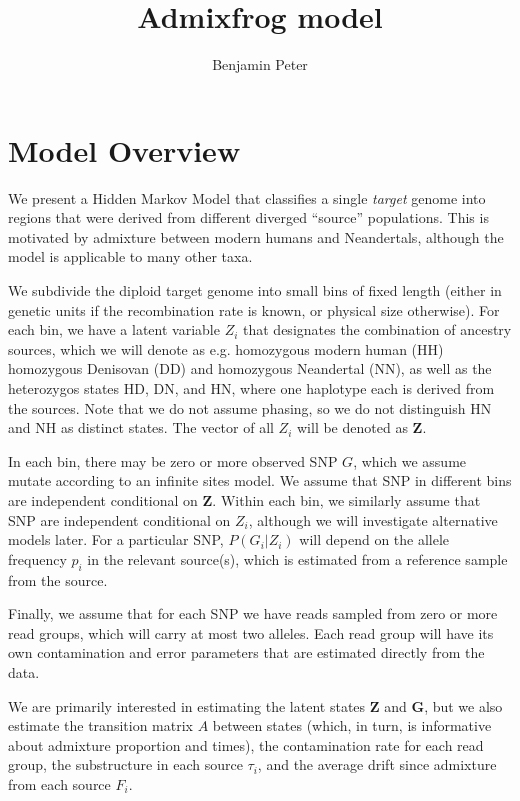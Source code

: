 \documentclass[10pt,a4paper]{article}
\author{Benjamin Peter}
\title{Admixfrog model}
\newcommand{\BFZ}{\mathbf{Z}}
\newcommand{\BFG}{\mathbf{G}}
\begin{document}
	\maketitle
\section*{Model Overview}

	We present a Hidden Markov Model that classifies a single \emph{target} genome into regions that were derived from different diverged ``source'' populations. This is motivated by admixture between modern humans and Neandertals, although the model is applicable to many other taxa. 
	
	We subdivide the diploid target genome into small bins of fixed length (either in genetic units if the recombination rate is known, or physical size otherwise). For each bin, we have a latent variable $Z_i$ that designates the combination of ancestry sources, which we will denote as e.g. homozygous modern human (HH) homozygous Denisovan (DD) and homozygous Neandertal (NN), as well as the heterozygos states HD, DN, and HN, where one haplotype each is derived from the sources. Note that we do not assume phasing, so we do not distinguish HN and NH as distinct states. The vector of all $Z_i$ will be denoted as $\BFZ$.
	
	In each bin, there may be zero or more observed SNP $G$, which we assume mutate according to an infinite sites model. We assume that SNP in different bins are independent conditional on $\BFZ$. Within each bin, we similarly assume that SNP are independent conditional on $Z_i$, although we will investigate alternative models later. For a particular SNP, $P(G_i | Z_i)$ will depend on the allele frequency $p_i$ in the relevant source(s), which is estimated from a reference sample from the source.
	
	Finally, we assume that for each SNP we have reads sampled from zero or more read groups, which will carry at most two alleles. Each read group will have its own contamination and error parameters that are estimated directly from the data.
	
	We are primarily interested in estimating the latent states $\BFZ$ and $\BFG$, but we also estimate the transition matrix $A$ between states (which, in turn, is informative about admixture proportion and times), the contamination rate for each read group, the substructure in each source $\tau_i$, and the average drift since admixture from each source $F_i$. 
\end{document}
